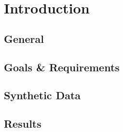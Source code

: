 \chapter{Introduction}
\section{General}
\lipsum[3-4]
\section{Goals \& Requirements}
\lipsum[9-11]
\section{Synthetic Data}
\lipsum[8-10]
\section{Results}
\lipsum[5-6]